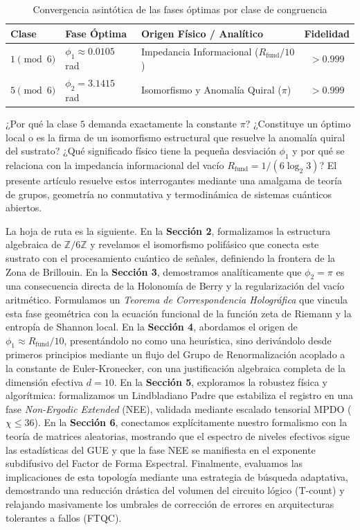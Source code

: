 \documentclass[12pt,a4paper]{article}
\theoremstyle{plain}
\theoremstyle{definition}
\theoremstyle{remark}
\begin{document}
\begin{table}[H]
\centering
\caption{Convergencia asintótica de las fases óptimas por clase de congruencia}
\label{tab:fases}
\begin{tabular}{lllc}
\toprule
\textbf{Clase} & \textbf{Fase Óptima} & \textbf{Origen Físico / Analítico} & \textbf{Fidelidad} \\
\midrule
$1 \pmod 6$ & $\phi_1 \approx 0.0105$ rad & Impedancia Informacional ($R_{\text{fund}}/10$) & $> 0.999$ \\
$5 \pmod 6$ & $\phi_2 = 3.1415$ rad & Isomorfismo y Anomalía Quiral ($\pi$) & $> 0.999$ \\
\bottomrule
\end{tabular}
\end{table}

¿Por qué la clase $5$ demanda exactamente la constante $\pi$? ¿Constituye un óptimo local o es la firma de un isomorfismo estructural que resuelve la anomalía quiral del sustrato? ¿Qué significado físico tiene la pequeña desviación $\phi_1$ y por qué se relaciona con la impedancia informacional del vacío $R_{\text{fund}} = 1/(6\log_2 3)$? El presente artículo resuelve estos interrogantes mediante una amalgama de teoría de grupos, geometría no conmutativa y termodinámica de sistemas cuánticos abiertos.

La hoja de ruta es la siguiente. En la \textbf{Sección 2}, formalizamos la estructura algebraica de $\mathbb{Z}/6\mathbb{Z}$ y revelamos el isomorfismo polifásico que conecta este sustrato con el procesamiento cuántico de señales, definiendo la frontera de la Zona de Brillouin. En la \textbf{Sección 3}, demostramos analíticamente que $\phi_2 = \pi$ es una consecuencia directa de la Holonomía de Berry y la regularización del vacío aritmético. Formulamos un \textit{Teorema de Correspondencia Holográfica} que vincula esta fase geométrica con la ecuación funcional de la función zeta de Riemann y la entropía de Shannon local. En la \textbf{Sección 4}, abordamos el origen de $\phi_1 \approx R_{\text{fund}}/10$, presentándolo no como una heurística, sino derivándolo desde primeros principios mediante un flujo del Grupo de Renormalización acoplado a la constante de Euler-Kronecker, con una justificación algebraica completa de la dimensión efectiva $d=10$. En la \textbf{Sección 5}, exploramos la robustez física y algorítmica: formalizamos un Lindbladiano Padre que estabiliza el registro en una fase \textit{Non-Ergodic Extended} (NEE), validada mediante escalado tensorial MPDO ($\chi \le 36$). En la \textbf{Sección 6}, conectamos explícitamente nuestro formalismo con la teoría de matrices aleatorias, mostrando que el espectro de niveles efectivos sigue las estadísticas del GUE y que la fase NEE se manifiesta en el exponente subdifusivo del Factor de Forma Espectral. Finalmente, evaluamos las implicaciones de esta topología mediante una estrategia de búsqueda adaptativa, demostrando una reducción drástica del volumen del circuito lógico (T-count) y relajando masivamente los umbrales de corrección de errores en arquitecturas tolerantes a fallos (FTQC).
\end{document}
